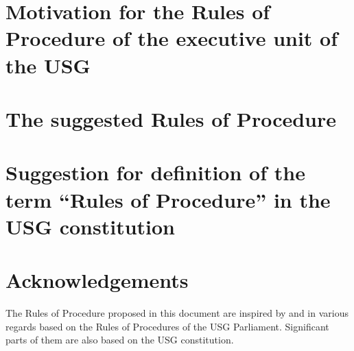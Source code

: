 \documentclass[a4paper,10pt]{article}
\begin{document}
 \maketitle
 \thispagestyle{main}
 \tableofcontents
%	 

  \section[Motivation]{Motivation for the Rules of Procedure of the executive unit of the USG}
	 
   \section{The suggested Rules of Procedure}
	 
   \section[Suggested definition of ``Rules of Procedure'']{Suggestion for definition of the term ``Rules of Procedure'' in the USG constitution}
	 
%	 
   \section*{Acknowledgements}
	 The Rules of Procedure proposed in this document are inspired by and in various regards based on the Rules of Procedures of the USG Parliament. Significant parts of them are also based on the USG constitution.
 \label{theEnd}
\end{document}
